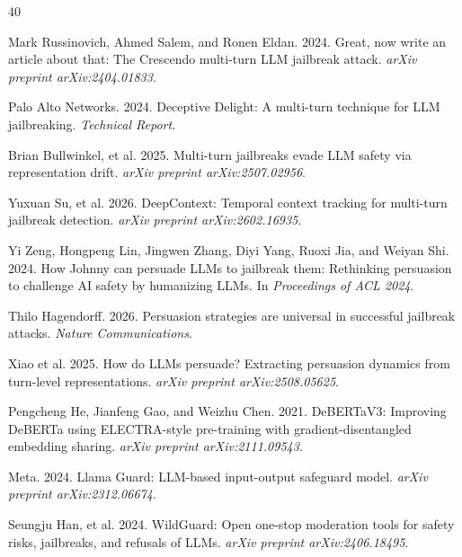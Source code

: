 \documentclass[11pt,a4paper]{article}
\begin{document}
\begin{thebibliography}{40}

Mark Russinovich, Ahmed Salem, and Ronen Eldan. 2024.
\newblock Great, now write an article about that: The Crescendo multi-turn LLM jailbreak attack.
\newblock \textit{arXiv preprint arXiv:2404.01833}.

Palo Alto Networks. 2024.
\newblock Deceptive Delight: A multi-turn technique for LLM jailbreaking.
\newblock \textit{Technical Report}.

Brian Bullwinkel, et al. 2025.
\newblock Multi-turn jailbreaks evade LLM safety via representation drift.
\newblock \textit{arXiv preprint arXiv:2507.02956}.

Yuxuan Su, et al. 2026.
\newblock DeepContext: Temporal context tracking for multi-turn jailbreak detection.
\newblock \textit{arXiv preprint arXiv:2602.16935}.

Yi Zeng, Hongpeng Lin, Jingwen Zhang, Diyi Yang, Ruoxi Jia, and Weiyan Shi. 2024.
\newblock How Johnny can persuade LLMs to jailbreak them: Rethinking persuasion to challenge AI safety by humanizing LLMs.
\newblock In \textit{Proceedings of ACL 2024}.

Thilo Hagendorff. 2026.
\newblock Persuasion strategies are universal in successful jailbreak attacks.
\newblock \textit{Nature Communications}.

Xiao et al. 2025.
\newblock How do LLMs persuade? Extracting persuasion dynamics from turn-level representations.
\newblock \textit{arXiv preprint arXiv:2508.05625}.

Pengcheng He, Jianfeng Gao, and Weizhu Chen. 2021.
\newblock DeBERTaV3: Improving DeBERTa using ELECTRA-style pre-training with gradient-disentangled embedding sharing.
\newblock \textit{arXiv preprint arXiv:2111.09543}.

Meta. 2024.
\newblock Llama Guard: LLM-based input-output safeguard model.
\newblock \textit{arXiv preprint arXiv:2312.06674}.

Seungju Han, et al. 2024.
\newblock WildGuard: Open one-stop moderation tools for safety risks, jailbreaks, and refusals of LLMs.
\newblock \textit{arXiv preprint arXiv:2406.18495}.


\end{thebibliography}
\end{document}
